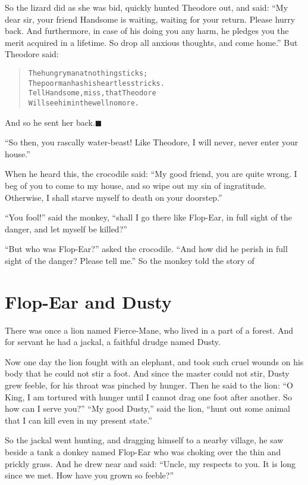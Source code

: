 \documentclass[article, twoside, 14pt]{memoir}
\newcommand{\qed}{\hfill \ensuremath{\blacksquare}}
\renewenvironment{verbatim}{%
\begin{quote}%
\vskip -10pt%
\begin{alltt}\normalfont\large}{\end{alltt}%
\end{quote}%
\vskip -10pt
} %
\begin{document}
So the lizard did as she was bid, quickly hunted Theodore out, and
said:
``My dear sir, your friend Handsome is waiting, waiting for your return. Please hurry back. And furthermore, in case of his doing you any harm, he pledges you the merit acquired in a lifetime. So drop all anxious thoughts, and come home.''
But Theodore said:

\begin{verbatim}
The hungry man at nothing sticks;
The poor man has his heartless tricks.
Tell Handsome, miss, that Theodore
Will see him in the well no more.
\end{verbatim}
And so he sent her back.\hyperref[s67]{\qed}

``So then, you rascally water-beast! Like Theodore, I will never, never enter your house.''

When he heard this, the crocodile said:
``My good friend, you are quite wrong. I beg of you to come to my house, and so wipe out my sin of ingratitude. Otherwise, I shall starve myself to death on your doorstep.''

``You fool!'' said the monkey,
``shall I go there like Flop-Ear, in full sight of the danger, and let myself be killed?''

``But who was Flop-Ear?'' asked the crocodile.
``And how did he perish in full sight of the danger? Please tell me.''
So the monkey told the story of

\chapter{Flop-Ear and Dusty}

\label{s68}

There was once a lion named Fierce-Mane, who lived in a part of a
forest. And for servant he had a jackal, a faithful drudge named
Dusty.

Now one day the lion fought with an elephant, and took such cruel
wounds on his body that he could not stir a foot. And since the
master could not stir, Dusty grew feeble, for his throat was
pinched by hunger. Then he said to the lion:
``O King, I am tortured with hunger until I cannot drag one foot after another. So how can I serve you?''
``My good Dusty,'' said the lion,
``hunt out some animal that I can kill even in my present state.''

So the jackal went hunting, and dragging himself to a nearby
village, he saw beside a tank a donkey named Flop-Ear who was
choking over the thin and prickly grass. And he drew near and said:
``Uncle, my respects to you. It is long since we met. How have you grown so feeble?''
\end{document}
